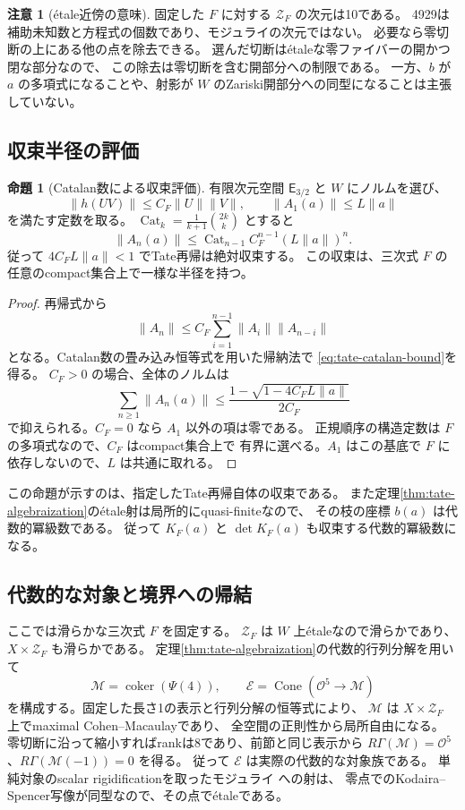 \documentclass[a4paper,11pt]{ltjsarticle}
\theoremstyle{definition}
\newtheorem{remark}[theorem]{注意}
\newtheorem{proposition}[theorem]{命題}
\newcommand{\OO}{\mathcal O}
\begin{document}
\begin{remark}[\'etale近傍の意味]
固定した $F$ に対する $\mathcal Z_F$ の次元は10である。
4929は補助未知数と方程式の個数であり、モジュライの次元ではない。
必要なら零切断の上にある他の点を除去できる。
選んだ切断は\'etaleな零ファイバーの開かつ閉な部分なので、
この除去は零切断を含む開部分への制限である。
一方、$b$ が $a$ の多項式になることや、射影が
$W$ のZariski開部分への同型になることは主張していない。
\end{remark}

\subsection{収束半径の評価}

\begin{proposition}[Catalan数による収束評価]
\label{prop:tate-catalan-convergence}
有限次元空間 $\mathsf E_{3/2}$ と $W$ にノルムを選び、
\[
 \|h(UV)\|\le C_F\|U\|\|V\|,
 \qquad \|A_1(a)\|\le L\|a\|
\]
を満たす定数を取る。
$\operatorname{Cat}_k=\frac1{k+1}\binom{2k}k$ とすると
\[
 \|A_n(a)\|
 \le\operatorname{Cat}_{n-1}C_F^{n-1}(L\|a\|)^n.
 \tag{A3}\label{eq:tate-catalan-bound}
\]
従って $4C_FL\|a\|<1$ でTate再帰は絶対収束する。
この収束は、三次式 $F$ の任意のcompact集合上で一様な半径を持つ。
\end{proposition}
\begin{proof}
再帰式から
\[
 \|A_n\|\le C_F\sum_{i=1}^{n-1}\|A_i\|\|A_{n-i}\|
\]
となる。Catalan数の畳み込み恒等式を用いた帰納法で
\eqref{eq:tate-catalan-bound}を得る。
$C_F>0$ の場合、全体のノルムは
\[
 \sum_{n\ge1}\|A_n(a)\|
 \le\frac{1-\sqrt{1-4C_FL\|a\|}}{2C_F}
\]
で抑えられる。$C_F=0$ なら $A_1$ 以外の項は零である。
正規順序の構造定数は $F$ の多項式なので、$C_F$ はcompact集合上で
有界に選べる。$A_1$ はこの基底で $F$ に依存しないので、$L$ は共通に取れる。
\end{proof}

この命題が示すのは、指定したTate再帰自体の収束である。
また定理\ref{thm:tate-algebraization}の\'etale射は局所的にquasi-finiteなので、
その枝の座標 $b(a)$ は代数的冪級数である。
従って $K_F(a)$ と $\det K_F(a)$ も収束する代数的冪級数になる。

\subsection{代数的な対象と境界への帰結}

ここでは滑らかな三次式 $F$ を固定する。
$\mathcal Z_F$ は $W$ 上\'etaleなので滑らかであり、
$X\times\mathcal Z_F$ も滑らかである。
定理\ref{thm:tate-algebraization}の代数的行列分解を用いて
\[
 \mathcal M=\operatorname{coker}(\Psi(4)),\qquad
 \mathcal E=\operatorname{Cone}(\OO^5\to\mathcal M)
\]
を構成する。固定した長さ1の表示と行列分解の恒等式により、
$\mathcal M$ は $X\times\mathcal Z_F$ 上でmaximal Cohen--Macaulayであり、
全空間の正則性から局所自由になる。
零切断に沿って縮小すればrankは8であり、前節と同じ表示から
$R\Gamma(\mathcal M)=\OO^5$、$R\Gamma(\mathcal M(-1))=0$ を得る。
従って $\mathcal E$ は実際の代数的な対象族である。
単純対象のscalar rigidificationを取ったモジュライ
\cite[Theorem 4.2.1, Corollary 4.3.3]{LieblichComplexes}への射は、
零点でのKodaira--Spencer写像が同型なので、その点で\'etaleである。
\end{document}
